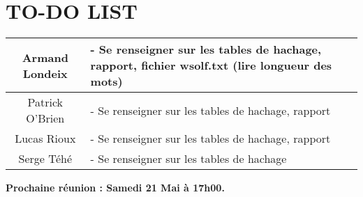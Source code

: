 \section*{TO-DO LIST}

\begin{center}
\begin{tabular}{|c|l|}
    \hline
    Armand Londeix & - Se renseigner sur les tables de hachage, rapport, fichier wsolf.txt (lire longueur des mots) \\
    \hline
    Patrick O'Brien & - Se renseigner sur les tables de hachage, rapport \\ 
   \hline
    Lucas Rioux & - Se renseigner sur les tables de hachage, rapport \\
    \hline
    Serge Téhé & - Se renseigner sur les tables de hachage \\
    \hline
\end{tabular}
\end{center}

\tabto{0cm}\textbf{Prochaine réunion : Samedi 21 Mai à 17h00.}